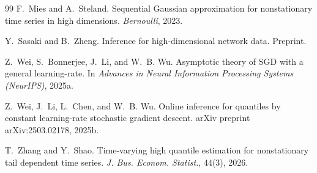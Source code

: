 \documentclass[12pt]{article}
\begin{document}
{\begin{thebibliography}{99}
F.~Mies and A.~Steland.
\newblock Sequential {G}aussian approximation for nonstationary time series in high dimensions.
\newblock \emph{Bernoulli}, 2023.

Y.~Sasaki and B.~Zheng.
\newblock Inference for high-dimensional network data.
\newblock Preprint.

Z.~Wei, S.~Bonnerjee, J.~Li, and W.~B. Wu.
\newblock Asymptotic theory of {SGD} with a general learning-rate.
\newblock In \emph{Advances in Neural Information Processing Systems (NeurIPS)}, 2025a.

Z.~Wei, J.~Li, L.~Chen, and W.~B. Wu.
\newblock Online inference for quantiles by constant learning-rate stochastic gradient descent.
\newblock arXiv preprint arXiv:2503.02178, 2025b.

T.~Zhang and Y.~Shao.
\newblock Time-varying high quantile estimation for nonstationary tail dependent time series.
\newblock \emph{J. Bus. Econom. Statist.}, 44(3), 2026.

\end{thebibliography}
}
\end{document}
